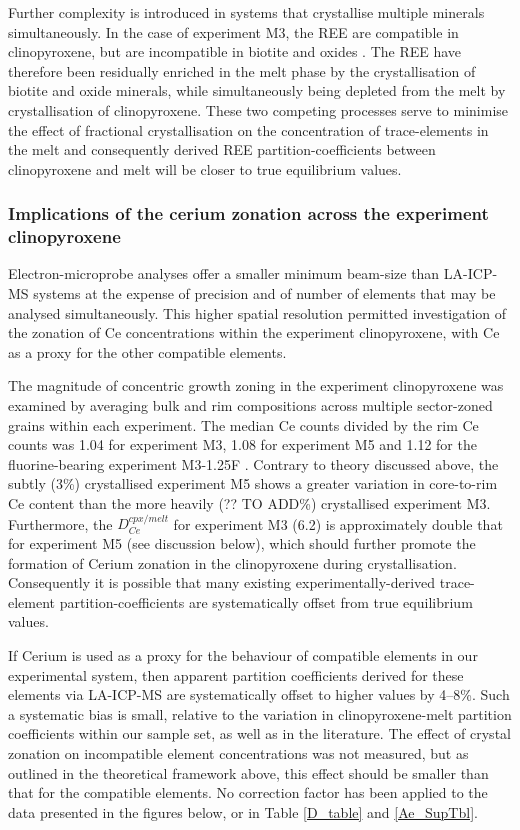     Further complexity is introduced in systems that crystallise multiple minerals simultaneously. In the case of experiment M3, the REE are compatible in clinopyroxene, but are incompatible in biotite and oxides \citep[e.g.][]{Mahood1990,Schmidt1999}. The REE have therefore been residually enriched in the melt phase by the crystallisation of biotite and oxide minerals, while simultaneously being depleted from the melt by crystallisation of clinopyroxene. These two competing processes serve to minimise the effect of fractional crystallisation on the concentration of trace-elements in the melt and consequently derived REE partition-coefficients between clinopyroxene and melt will be closer to true equilibrium values.

\subsubsection{Implications of the cerium zonation across the experiment clinopyroxene}
    Electron-microprobe analyses offer a smaller minimum beam-size than LA-ICP-MS systems at the expense of precision and of number of elements that may be analysed simultaneously. This higher spatial resolution permitted investigation of the zonation of Ce concentrations within the experiment clinopyroxene, with Ce as a proxy for the other compatible elements.


The magnitude of concentric growth zoning in the experiment clinopyroxene was examined by averaging bulk and rim compositions across multiple sector-zoned grains within each experiment. The median Ce counts divided by the rim Ce counts was 1.04 for experiment M3, 1.08 for experiment M5 and 1.12 for the fluorine-bearing experiment M3-1.25F \citep[see][]{Beard_PhD_thesis}. Contrary to theory discussed above, the subtly (3\%) crystallised experiment M5 shows a greater variation in core-to-rim Ce content than the more heavily (?? TO ADD\%) crystallised experiment M3. Furthermore, the $D_{Ce}^{cpx/melt}$ for experiment M3 (6.2) is approximately double that for experiment M5 (see discussion below), which should further promote the formation of Cerium zonation in the clinopyroxene during crystallisation. Consequently it is possible that many existing experimentally-derived trace-element partition-coefficients are systematically offset from true equilibrium values.

If Cerium is used as a proxy for the behaviour of compatible elements in our experimental system, then apparent partition coefficients derived for these elements via LA-ICP-MS are systematically offset to higher values by 4--8\%. Such a systematic bias is small, relative to the variation in clinopyroxene-melt partition coefficients within our sample set, as well as in the literature. The effect of crystal zonation on incompatible element concentrations was not measured, but as outlined in the theoretical framework above, this effect should be smaller than that for the compatible elements. No correction factor has been applied to the data presented in the figures below, or in Table \ref{D_table} and \ref{Ae_SupTbl}. 